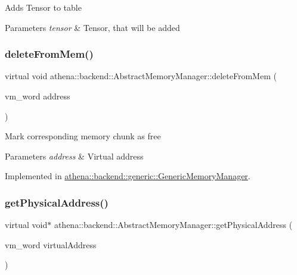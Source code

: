 Adds Tensor to table 
\begin{DoxyParams}{Parameters}
{\em tensor} & Tensor, that will be added \\
\hline
\end{DoxyParams}
\mbox{\label{classathena_1_1backend_1_1_abstract_memory_manager_a8ffd6cf21559978f394e2e11815506b5}} 
\subsubsection{\texorpdfstring{delete\+From\+Mem()}{deleteFromMem()}}
{\footnotesize\ttfamily virtual void athena\+::backend\+::\+Abstract\+Memory\+Manager\+::delete\+From\+Mem (\begin{DoxyParamCaption}\item[{vm\+\_\+word}]{address }\end{DoxyParamCaption})\hspace{0.3cm}{\ttfamily [pure virtual]}}

Mark corresponding memory chunk as free 
\begin{DoxyParams}{Parameters}
{\em address} & Virtual address \\
\hline
\end{DoxyParams}


Implemented in \mbox{\hyperlink{classathena_1_1backend_1_1generic_1_1_generic_memory_manager_a2767b6c1f5887a2928b665e0c1b454c7}{athena\+::backend\+::generic\+::\+Generic\+Memory\+Manager}}.

\mbox{\label{classathena_1_1backend_1_1_abstract_memory_manager_ad441d7a2281f5f2b2627272d136f72b8}} 
\subsubsection{\texorpdfstring{get\+Physical\+Address()}{getPhysicalAddress()}}
{\footnotesize\ttfamily virtual void$\ast$ athena\+::backend\+::\+Abstract\+Memory\+Manager\+::get\+Physical\+Address (\begin{DoxyParamCaption}\item[{vm\+\_\+word}]{virtual\+Address }\end{DoxyParamCaption})\hspace{0.3cm}{\ttfamily [pure virtual]}}

